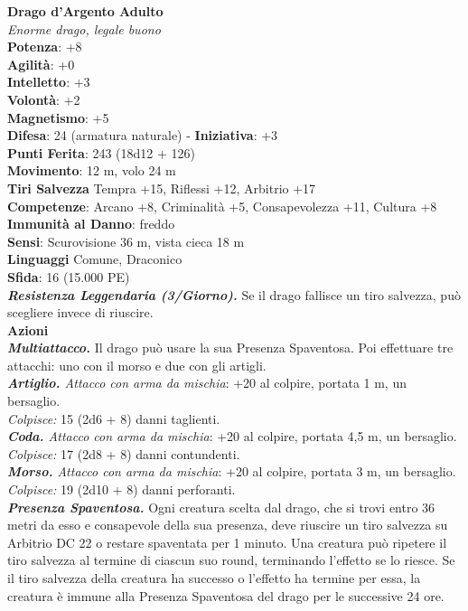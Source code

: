 \begin{multicols}{2}
\medskip\textbf{Drago d'Argento Adulto}\\
\emph{Enorme drago, legale buono}\\
\textbf{Potenza}: +8\\
\textbf{Agilità}: +0\\
\textbf{Intelletto}: +3\\
\textbf{Volontà}: +2\\
\textbf{Magnetismo}: +5\\
\textbf{Difesa}: 24 (armatura naturale) - \textbf{Iniziativa}: +3\\
\textbf{Punti Ferita}: 243 (18d12 + 126)\\
\textbf{Movimento}: 12 m, volo 24 m\\
\textbf{Tiri Salvezza} Tempra +15, Riflessi +12, Arbitrio +17\\
\textbf{Competenze}: Arcano +8, Criminalità +5, Consapevolezza +11, Cultura +8\\
\textbf{Immunità al Danno}: freddo\\
\textbf{Sensi}: Scurovisione 36 m, vista cieca 18 m\\
\textbf{Linguaggi} Comune, Draconico\\
\textbf{Sfida}: 16 (15.000 PE)\smallskip\\
\emph{\textbf{Resistenza Leggendaria (3/Giorno).}} Se il drago fallisce un tiro salvezza, può scegliere invece di riuscire.\\
\smallskip\textbf{Azioni}\\
\emph{\textbf{Multiattacco.}} Il drago può usare la sua Presenza Spaventosa. Poi effettuare tre attacchi: uno con il morso e due con gli artigli.\\
\emph{\textbf{Artiglio.} Attacco con arma da mischia}: +20 al colpire, portata 1 m, un bersaglio.\\
\emph{Colpisce:} 15 (2d6 + 8) danni taglienti.\\
\emph{\textbf{Coda.} Attacco con arma da mischia}: +20 al colpire, portata 4,5 m, un bersaglio.\\
\emph{Colpisce:} 17 (2d8 + 8) danni contundenti.\\
\emph{\textbf{Morso.} Attacco con arma da mischia}: +20 al colpire, portata 3 m, un bersaglio.\\
\emph{Colpisce:} 19 (2d10 + 8) danni perforanti.\\
\emph{\textbf{Presenza Spaventosa.}} Ogni creatura scelta dal drago, che si trovi entro 36 metri da esso e consapevole della sua presenza, deve riuscire un tiro salvezza su Arbitrio DC  22 o restare spaventata per 1 minuto. Una creatura può ripetere il tiro salvezza al termine di ciascun suo round, terminando l'effetto se lo riesce. Se il tiro salvezza della creatura ha successo o l'effetto ha termine per essa, la creatura è immune alla Presenza Spaventosa del drago per le successive 24 ore.\\

\end{multicols}
